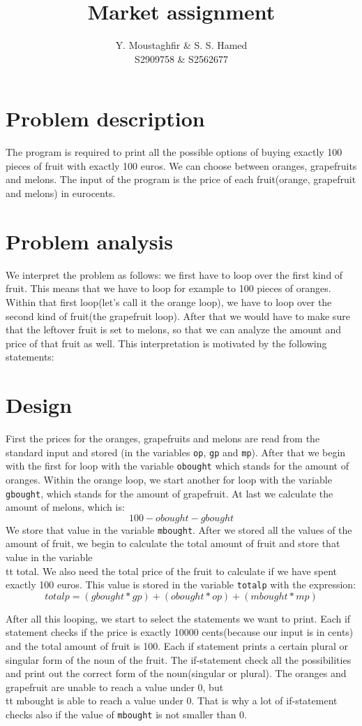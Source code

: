 \documentclass[a4paper,10pt]{article}
\title{Market assignment}
\author{Y. Moustaghfir \& S. S. Hamed\\
        S2909758 \& S2562677}
\begin{document}
\maketitle

\section{Problem description}
The program is required to print all the possible options of buying exactly 100 pieces of fruit with exactly 100 euros. We can choose between oranges, grapefruits and melons. The input of the program is the price of each fruit(orange, grapefruit and melons) in eurocents. 

\section{Problem analysis}
We interpret the problem as follows: we first have to loop over the first kind of fruit. This means that we have to loop for example to 100 pieces of oranges. Within that first loop(let's call it the orange loop), we have to loop over the second kind of fruit(the grapefruit loop). After that we would have to make sure that the leftover fruit is set to melons, so that we can analyze the amount and price of that fruit as well.
This interpretation is motivated by the following statements:

\section{Design}
First the prices for the oranges, grapefruits and melons are read from the standard input and stored (in the variables {\tt op}, {\tt gp} and {\tt mp}). 
After that we begin with the first for loop with the variable {\tt obought} which stands for the amount of oranges. Within the orange loop, we start another for loop with the variable {\tt gbought}, which stands for the amount of grapefruit. At last we calculate the amount of melons, which is: $$100 - obought - gbought$$We store that value in the variable {\tt mbought}.
After we stored all the values of the amount of fruit, we begin to calculate the total amount of fruit and store that value in the variable {\\tt total}. We also need the total price of the fruit to calculate if we have spent exactly 100 euros. This value is stored in the variable {\tt totalp} with the expression: $$totalp = (gbought * gp) + (obought * op) + (mbought * mp)$$

After all this looping, we start to select the statements we want to print. Each if statement checks if the price is exactly 10000 cents(because our input is in cents) and the total amount of fruit is 100. Each if statement prints a certain plural or singular form of the noun of the fruit. The if-statement check all the possibilities and print out the correct form of the noun(singular or plural). The oranges and grapefruit are unable to reach a value under 0, but {\\tt mbought} is able to reach a value under 0. That is why a lot of if-statement checks also if the value of {\tt mbought} is not smaller than 0.
\end{document}
